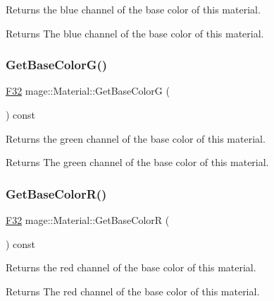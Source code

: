 Returns the blue channel of the base color of this material.

\begin{DoxyReturn}{Returns}
The blue channel of the base color of this material. 
\end{DoxyReturn}
\hypertarget{structmage_1_1_material_a74686fb74ca82f32d9e9ea6c30b182e5}{}\label{structmage_1_1_material_a74686fb74ca82f32d9e9ea6c30b182e5} 
\subsubsection{\texorpdfstring{Get\+Base\+Color\+G()}{GetBaseColorG()}}
{\footnotesize\ttfamily \hyperlink{namespacemage_aa97e833b45f06d60a0a9c4fc22ae02c0}{F32} mage\+::\+Material\+::\+Get\+Base\+ColorG (\begin{DoxyParamCaption}{ }\end{DoxyParamCaption}) const\hspace{0.3cm}{\ttfamily [noexcept]}}

Returns the green channel of the base color of this material.

\begin{DoxyReturn}{Returns}
The green channel of the base color of this material. 
\end{DoxyReturn}
\hypertarget{structmage_1_1_material_ae9b271a0557e61f4dfb926780ec591ef}{}\label{structmage_1_1_material_ae9b271a0557e61f4dfb926780ec591ef} 
\subsubsection{\texorpdfstring{Get\+Base\+Color\+R()}{GetBaseColorR()}}
{\footnotesize\ttfamily \hyperlink{namespacemage_aa97e833b45f06d60a0a9c4fc22ae02c0}{F32} mage\+::\+Material\+::\+Get\+Base\+ColorR (\begin{DoxyParamCaption}{ }\end{DoxyParamCaption}) const\hspace{0.3cm}{\ttfamily [noexcept]}}

Returns the red channel of the base color of this material.

\begin{DoxyReturn}{Returns}
The red channel of the base color of this material. 
\end{DoxyReturn}
\hypertarget{structmage_1_1_material_ab1922190e8759c458ade0dfac0da5805}{}\label{structmage_1_1_material_ab1922190e8759c458ade0dfac0da5805} 
